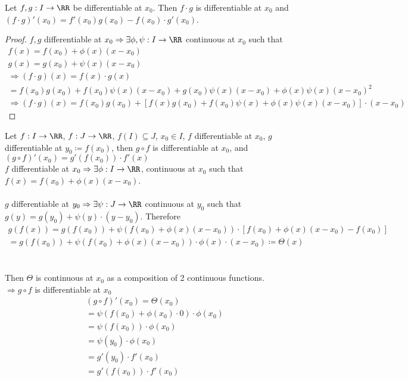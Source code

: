 \documentclass[class=scrartcl, crop=false]{standalone}
\begin{document}
\begin{theorem}
  Let $f, g: I \to \RR$ be differentiable at $x_0$. Then $f \cdot g$ is differentiable at $x_0$ and $(f\cdot g)'(x_0) = f'(x_0)g(x_0) - f(x_0) \cdot g'(x_0)$.

  \begin{proof}
    $f, g$ differentiable at $x_0 \Rightarrow \exists \phi, \psi : I \to \RR$ continuous at $x_0$ such that 
    \begin{gather*}
      f(x) = f(x_0) + \phi(x) (x - x_0) \\
      g(x) = g(x_0) + \psi(x)(x - x_0) \\
      \Rightarrow (f \cdot g)(x) = f(x) \cdot g(x) 
      \\
      = f(x_0)g(x_0) + f(x_0)\psi(x)(x - x_0) + g(x_0)\psi(x)(x - x_0) + \phi(x)\psi(x)(x - x_0)^2
      \\
      \Rightarrow
      (f \cdot g)(x) = f(x_0)g(x_0) + [f(x)g(x_0) + f(x_0) \psi (x) + \phi(x)\psi(x)(x - x_0)] \cdot (x - x_0)
    \end{gather*} 
  \end{proof} 
\end{theorem} 

\begin{theorem}
  Let $f: I \to \RR$, $f: J \to \RR$, $f(I) \subseteq J$, $x_0 \in I$, $f$ differentiable at $x_0$, $g$ differentiable at $y_0 \coloneqq f(x_0)$, then $g\circ f$ is differentiable at $x_0$, and $(g \circ f)'(x_0) = g'(f(x_0)) \cdot f'(x)$ 
  \\
  $f$ differentiable at $x_0 \Rightarrow \exists \phi: I \to \RR$, continuous at $x_0$ such that $f(x) = f(x_0) + \phi(x)(x - x_0)$.
  \\\\
  $g$ differentiable at $y_0 \Rightarrow \exists \psi : J \to \RR$ continuous at $y_0$ such that $g(y) = g(y_0) + \psi(y) \cdot (y - y_0)$.
  Therefore
  \begin{gather*}
    g(f(x)) = g(f(x_0)) + \psi(f(x_0) + \phi(x)(x - x_0)) \cdot [f(x_0) + \phi(x)(x - x_0) - f(x_0)]
    \\
    = g(f(x_0)) + \psi(f(x_0) + \phi(x)(x - x_0)) \cdot \phi(x) \cdot (x - x_0) \coloneqq \Theta(x)
  \end{gather*} 
  \\\\
  Then $\Theta$ is continuous at $x_0$ as a composition of 2 continuous functions.
  \\
  $\Rightarrow g \circ f$ is differentiable at $x_0$
  \begin{gather*}
    (g \circ f)'(x_0) = \Theta (x_0) \\
    = \psi(f(x_0) + \phi(x_0) \cdot 0) \cdot \phi(x_0) \\
    = \psi(f(x_0)) \cdot \phi(x_0) \\
    = \psi(y_0) \cdot \phi(x_0) \\
    = g'(y_0) \cdot f'(x_0) \\
    = g'(f(x_0)) \cdot f'(x_0)
  \end{gather*} 
\end{theorem} 
\end{document}
